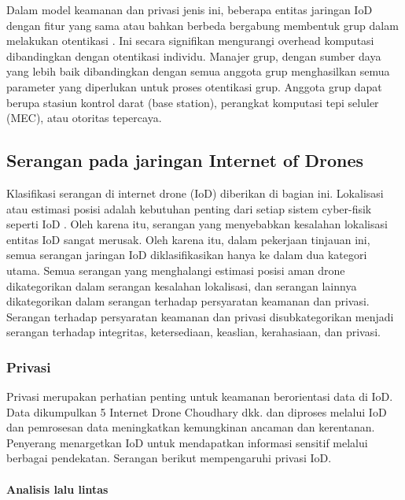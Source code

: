 Dalam model keamanan dan privasi jenis ini, beberapa entitas jaringan IoD dengan fitur yang sama atau bahkan berbeda bergabung membentuk grup dalam melakukan otentikasi \citep{aydin2021group}. Ini secara signifikan mengurangi overhead komputasi dibandingkan dengan otentikasi individu. Manajer grup, dengan sumber daya yang lebih baik dibandingkan dengan semua anggota grup menghasilkan semua parameter yang diperlukan untuk proses otentikasi grup. Anggota grup dapat berupa stasiun kontrol darat (base station), perangkat komputasi tepi seluler (MEC), atau otoritas tepercaya.

\subsection{Serangan pada jaringan Internet of Drones}
\label{subsec:serangandrone}

Klasifikasi serangan di internet drone (IoD) diberikan di bagian ini. Lokalisasi atau estimasi posisi adalah kebutuhan penting dari setiap sistem cyber-fisik seperti IoD \citep{abdelhafez2020localization}. Oleh karena itu, serangan yang menyebabkan kesalahan lokalisasi entitas IoD sangat merusak. Oleh karena itu, dalam pekerjaan tinjauan ini, semua serangan jaringan IoD diklasifikasikan hanya ke dalam dua kategori utama. Semua serangan yang menghalangi estimasi posisi aman drone dikategorikan dalam serangan kesalahan lokalisasi, dan serangan lainnya dikategorikan dalam serangan terhadap persyaratan keamanan dan privasi. Serangan terhadap persyaratan keamanan dan privasi disubkategorikan menjadi serangan terhadap integritas, ketersediaan, keaslian, kerahasiaan, dan privasi.

\subsubsection{Privasi}
\label{subsubsec:privasi}

Privasi merupakan perhatian penting untuk keamanan berorientasi data di IoD. Data dikumpulkan 5 Internet Drone Choudhary dkk. dan diproses melalui IoD dan pemrosesan data meningkatkan kemungkinan ancaman dan kerentanan. Penyerang menargetkan IoD untuk mendapatkan informasi sensitif melalui berbagai pendekatan. Serangan berikut mempengaruhi privasi IoD.

\paragraph{Analisis lalu lintas}
\label{par:anallalulintas}

